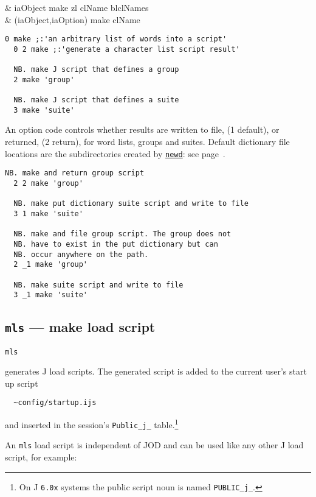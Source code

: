 \begin{wordhead}
\dyad & iaObject make zl \argsep clName \argsep blclNames \\
      & (iaObject,iaOption) make clName \\
\end{wordhead}
\begin{lstlisting}[frame=single,framerule=0pt] 
  0 make ;:'an arbitrary list of words into a script'
  0 2 make ;:'generate a character list script result' 

  NB. make J script that defines a group
  2 make 'group' 
  
  NB. make J script that defines a suite 
  3 make 'suite' 
\end{lstlisting}

An option code controls whether 
results are written to file, (1 default),
or returned, (2 return), for word lists, groups and suites.
Default dictionary file locations are the 
subdirectories created by \hyperlink{il:newd}{\texttt{newd}}: see page~\pageref{ss:newd}.

\begin{lstlisting}[frame=single,framerule=0pt] 
  NB. make and return group script
  2 2 make 'group'  
  
  NB. make put dictionary suite script and write to file 
  3 1 make 'suite'  

  NB. make and file group script. The group does not
  NB. have to exist in the put dictionary but can
  NB. occur anywhere on the path. 
  2 _1 make 'group'

  NB. make suite script and write to file 
  3 _1 make 'suite' 
\end{lstlisting}


\subsection{\texttt{mls} --- make load script}\label{ss:mls} 

\hypertarget{il:mls}{\texttt{mls}} generates J 
load scripts.  
The generated script is added 
to the current user's start up script
\begin{verbatim}
  ~config/startup.ijs
\end{verbatim}
and inserted in the session's \verb|Public_j_| table.\footnote{
On J \texttt{6.0x} systems the public script noun is named \texttt{PUBLIC\_j\_}.}

An \verb|mls| load script is independent of JOD and can be used 
like any other J load script, for example:

